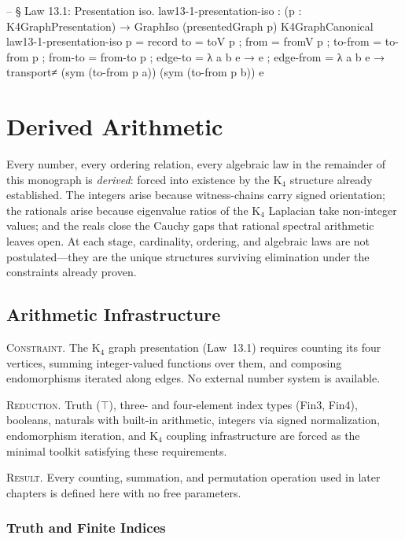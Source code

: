 \documentclass[11pt,a4paper]{book}
\def\texttt#1{#1}%
\begin{document}
\begin{code}
-- § Law 13.1: Presentation iso.
law13-1-presentation-iso : (p : K4GraphPresentation) → GraphIso (presentedGraph p) K4GraphCanonical
law13-1-presentation-iso p = record
  { to = toV p
  ; from = fromV p
  ; to-from = to-from p
  ; from-to = from-to p
  ; edge-to = λ {a} {b} e → e
  ; edge-from = λ {a} {b} e →
      transport≠ (sym (to-from p a)) (sym (to-from p b)) e
  }
\end{code}

\part{Derived Arithmetic}

Every number, every ordering relation, every algebraic law in the remainder of this
monograph is \emph{derived}: forced into existence by the K$_4$ structure already
established. The integers arise because witness-chains carry signed orientation;
the rationals arise because eigenvalue ratios of the K$_4$ Laplacian take non-integer
values; and the reals close the Cauchy gaps that rational spectral arithmetic leaves open.
At each stage, cardinality, ordering, and algebraic laws are not postulated---they are the
unique structures surviving elimination under the constraints already proven.

\chapter{Arithmetic Infrastructure}

\textsc{Constraint.}
The K$_4$ graph presentation (Law~13.1) requires counting its four vertices, summing
integer-valued functions over them, and composing endomorphisms iterated along edges.
No external number system is available.

\textsc{Reduction.}
Truth ($\top$), three- and four-element index types (\texttt{Fin3}, \texttt{Fin4}),
booleans, naturals with built-in arithmetic, integers via signed normalization,
endomorphism iteration, and K$_4$ coupling infrastructure are forced as the minimal
toolkit satisfying these requirements.

\textsc{Result.}
Every counting, summation, and permutation operation used in later chapters is defined
here with no free parameters.

\section{Truth and Finite Indices}
\end{document}
